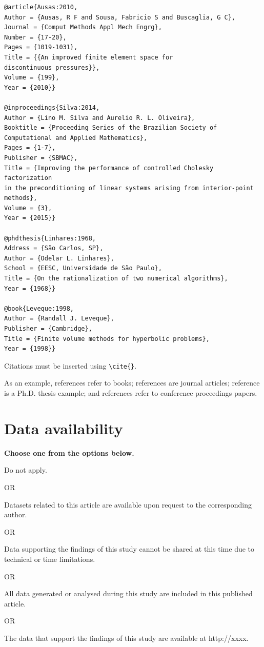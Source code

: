 \documentclass[english]{TCAM} %
\begin{document}
\begin{framed}
\begin{verbatim}
@article{Ausas:2010,
Author = {Ausas, R F and Sousa, Fabricio S and Buscaglia, G C},
Journal = {Comput Methods Appl Mech Engrg},
Number = {17-20},
Pages = {1019-1031},
Title = {{An improved finite element space for
discontinuous pressures}},
Volume = {199},
Year = {2010}}

@inproceedings{Silva:2014,
Author = {Lino M. Silva and Aurelio R. L. Oliveira},
Booktitle = {Proceeding Series of the Brazilian Society of
Computational and Applied Mathematics},
Pages = {1-7},
Publisher = {SBMAC},
Title = {Improving the performance of controlled Cholesky factorization
in the preconditioning of linear systems arising from interior-point
methods},
Volume = {3},
Year = {2015}}

@phdthesis{Linhares:1968,
Address = {São Carlos, SP},
Author = {Odelar L. Linhares},
School = {EESC, Universidade de São Paulo},
Title = {On the rationalization of two numerical algorithms},
Year = {1968}}

@book{Leveque:1998,
Author = {Randall J. Leveque},
Publisher = {Cambridge},
Title = {Finite volume methods for hyperbolic problems},
Year = {1998}}
\end{verbatim}
\end{framed}

Citations must be inserted using \verb|\cite{}|.

As an example, references \cite{Chihara:1978,Leveque:1998} refer to books; references \cite{Ausas:2010,Cordeiro:2013,Courant:1943} are journal articles; reference \cite{Linhares:1968} is a Ph.D. thesis example; and references \cite{Gautschi:1981,Jones:1986,Silva:2014} refer to conference proceedings papers.


\section*{Data availability}

\noindent \textbf{Choose one from the options below.}

\noindent Do not apply.

OR

\noindent Datasets related to this article are available upon request to the corresponding author.

OR

\noindent Data supporting the findings of this study cannot be shared at this time due to technical or time limitations.

OR

\noindent All data generated or analysed during this study are included in this published article.

OR

\noindent The data that support the findings of this study are available at http://xxxx.





\end{document}
